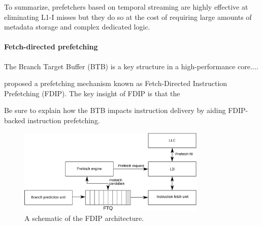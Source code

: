 \documentclass[../main.tex]{subfiles}
\begin{document}
\begin{refsection}
To summarize, prefetchers based on temporal streaming are highly effective at eliminating L1-I misses but they do so at the cost of requiring large amounts of metadata storage and complex dedicated logic.

\paragraph{Fetch-directed prefetching}
The Branch Target Buffer (BTB) is a key structure in a high-performance core.... 

\textcite{reinman99_fetch_direc_instr_prefet} proposed a prefetching mechanism known as Fetch-Directed Instruction Prefetching (FDIP). The key insight of FDIP is that the 





Be sure to explain how the BTB impacts instruction delivery by aiding FDIP-backed instruction prefetching.

\begin{figure}[ht]
  \centering
  \includegraphics[width=0.8\textwidth]{figures/fdip1.pdf}
  \caption{\label{fig:fdip} A schematic of the FDIP architecture.}
\end{figure}









\end{refsection}
\end{document}
